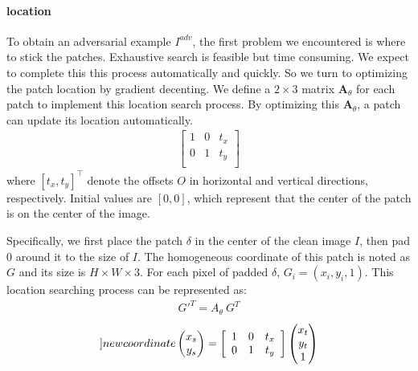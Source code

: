 \documentclass[10pt,twocolumn,letterpaper]{article}
\begin{document}
\paragraph{location}
To obtain an adversarial example $I^{adv}$,
the first problem we encountered is where to stick the patches.
Exhaustive search is feasible but time consuming. We expect to
complete this this process automatically and quickly.
So we turn to optimizing the patch location 
by gradient decenting.  
We define a $2 \times 3$ matrix 
$\mathbf{A}_\theta$ for each patch to implement this 
location search process.
By optimizing this $\mathbf{A}_\theta$, a patch can update its 
location automatically.
\begin{align}
	\left[
		\begin{array}{ccc}
			1 & 0 & t_x \\
			0 & 1 & t_y \\
		\end{array}
		\right]      
\end{align}
where $[t_x,t_y]^\top$ denote the offsets $O$ in 
horizontal and vertical directions, respectively. 
Initial values are $[0,0]$, which represent
that the center of the patch is on the center of the image.


Specifically, we first place the patch $\delta$
in the center of the 
clean image $I$,
then pad 0 around it to the size of $I$.
The homogeneous coordinate of this 
patch is noted as $G$ and its size is $H\times W\times 3$.
For each pixel of padded $\delta$, $G_i = (x_i, y_i, 1)$.
This location searching process can be represented as:
\begin{align}
	{G'}^T = A_{\theta}~{G}^T
\end{align}
\begin{align}
	\label[]{new coordinate}
\begin{pmatrix}
	x_s\\
	y_s	
	\end{pmatrix} = 
		\left[
			\begin{array}{ccc}
				1 & 0 & t_x \\
				0 & 1 & t_y \\
			\end{array}
			\right] 
			\begin{pmatrix}
				x_t\\
				y_t\\
				1	
				\end{pmatrix} 
\end{align}
\end{document}
